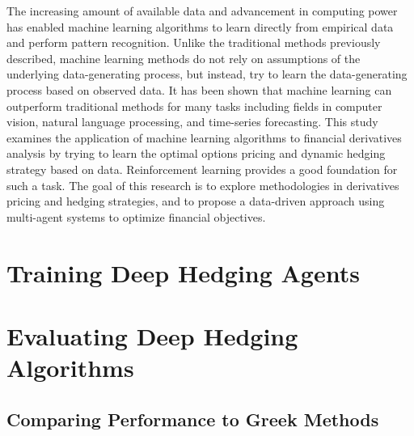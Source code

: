 The increasing amount of available data and advancement in computing power has enabled machine learning algorithms to learn directly from empirical data and perform pattern recognition. Unlike the traditional methods previously described, machine learning methods do not rely on assumptions of the underlying data-generating process, but instead, try to learn the data-generating process based on observed data. It has been shown that machine learning can outperform traditional methods for many tasks including fields in computer vision, natural language processing, and time-series forecasting. This study examines the application of machine learning algorithms to financial derivatives analysis by trying to learn the optimal options pricing and dynamic hedging strategy based on data. Reinforcement learning provides a good foundation for such a task. The goal of this research is to explore methodologies in derivatives pricing and hedging strategies, and to propose a data-driven approach using multi-agent systems to optimize financial objectives.

\section{Training Deep Hedging Agents}

\section{Evaluating Deep Hedging Algorithms}

\subsection{Comparing Performance to Greek Methods}